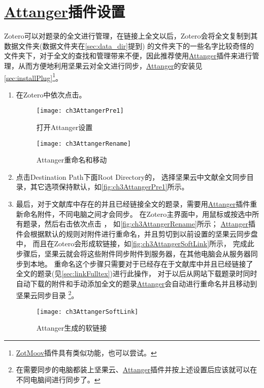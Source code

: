 \documentclass[theorem=false,mathfont=none,openany,sub3section]{easybook}
\begin{document}
\section{\href{https://github.com/MuiseDestiny/zotero-attanger}{Attanger}插件设置}\label{sec:AttangerPre}
Zotero可以对题录的全文进行管理，在链接上全文以后，Zotero会将全文复制到其数据文件夹(数据文件夹在\cref{sec:data_dir}提到)
的文件夹下的一些名字比较奇怪的文件夹下，对于全文的查找和管理带来不便，因此推荐使用\href{https://github.com/MuiseDestiny/zotero-attanger}{Attanger}插件来进行管理，从而方便地利用坚果云对全文进行同步，\href{https://github.com/MuiseDestiny/zotero-attanger}{Attanger}的安装见\cref{sec:installPlug}\footnote{\href{https://github.com/wileyyugioh/zotmoov}{ZotMoov}插件具有类似功能，也可以尝试。}。
\begin{enumerate}
	\item 在Zotero中依次点击。
	\begin{figure}[t]
		\centering
		\texttt{[image: ch3AttangerPre1]}
		\caption{打开Attanger设置}
		\label{fig:ch3AttangerPre1}
	\end{figure}
	
	\begin{figure}[t]
		\centering
		\texttt{[image: ch3AttangerRename]}
		\caption{Attanger重命名和移动}
		\label{fig:ch3AttangerRename}
	\end{figure}
	\item 点击Destination Path下面Root Directory的，
	选择坚果云中文献全文同步目录，其它选项保持默认，如\autoref{fig:ch3AttangerPre1}所示。
 
	\item 最后，对于文献库中存在的并且已经链接全文的题录，需要用\href{https://github.com/MuiseDestiny/zotero-attanger}{Attanger}插件重新命名附件，不同电脑之间才会同步。
	在Zotero主界面中，用鼠标或按选中所有题录，然后右击依次点击
	，
	如\autoref{fig:ch3AttangerRename}所示；
	\href{https://github.com/MuiseDestiny/zotero-attanger}{Attanger}插件会根据默认的规则对附件进行重命名，并且剪切到以前设置的坚果云同步盘中，
	而且在Zotero会形成软链接，如\autoref{fig:ch3AttangerSoftLink}所示，
	完成此步骤后，坚果云就会将这些附件同步附件到服务器，在其他电脑会从服务器同步到本地。
	重命名这个步骤只需要对于已经存在于文献库中并且已经链接了全文的题录(见\cref{sec:linkFulltex})进行此操作，
	对于以后从网站下载题录时同时自动下载的附件和手动添加全文的题录\href{https://github.com/MuiseDestiny/zotero-attanger}{Attanger}会自动进行重命名并且移动到坚果云同步目录
	\footnote{在需要同步的电脑都装上坚果云、\href{https://github.com/MuiseDestiny/zotero-attanger}{Attanger}插件并按上述设置后应该就可以在不同电脑间进行同步了。}。
	\begin{figure}[htbp]
		\centering
		\texttt{[image: ch3AttangerSoftLink]}
		\caption{Attanger生成的软链接}
		\label{fig:ch3AttangerSoftLink}
	\end{figure}
	
	\end{enumerate}
\end{document}
